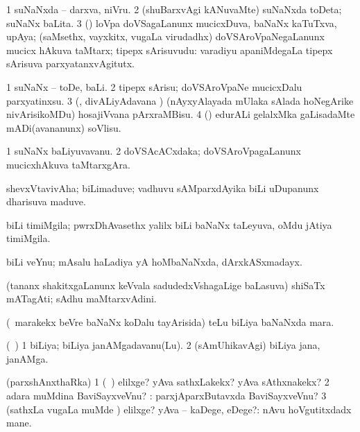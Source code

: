 \bentry
{} 
\gl{\nA}
\expl{}
\bmng
\bnum
\num{1} suNaNxda -- darxva, niVru. 
\num{2} (shuBarxvAgi kANuvaMte) suNaNxda toDeta; suNaNx baLita. 
\num{3} (\rUpa) loVpa doVSagaLanunx mucicxDuva, baNaNx kaTuTxva, upAya; (saMsethx, vayxkitx, \mo vugaLa virudadhx) doVSAroVpaNegaLanunx mucicx hAkuva taMtarx; tipepx sArisuvudu:  varadiyu apaniMdegaLa tipepx sArisuva parxyatanxvAgitutx. 
\enum
\emng
\eentry

\bentry
{} 
\gl{\sakirx}
\bmng
\bnum
\num{1} suNaNx -- toDe, baLi. 
\num{2} tipepx sArisu; doVSAroVpaNe mucicxDalu parxyatinxsu. 
\num{3} (\kaparx, divALiyAdavana \vi) (nAyxyAlayada mUlaka sAlada hoNegArike nivArisikoMDu) hosajiVvana pArxraMBisu. 
\num{4} (\ame) edurALi gelalxMka gaLisadaMte mADi(avananunx) soVlisu. 
\enum
\emng
\eentry

\bentry
{}
\gl{\nA}
\bmng
\bnum
\num{1} suNaNx baLiyuvavanu. 
\num{2} doVSAcACxdaka; doVSAroVpagaLanunx mucicxhAkuva taMtarxgAra. 
\enum
\emng
\eentry

\bentry
{}
\gl{\nA}
\bmng
shevxVtavivAha; biLimaduve; vadhuvu sAMparxdAyika biLi uDupanunx dharisuva maduve. 
\emng
\eentry

\bentry
{} 
\gl{\nA}
\expl{}
\bmng
biLi timiMgila; pwrxDhAvasethx yalilx biLi baNaNx taLeyuva, oMdu jAtiya timiMgila. 
\emng
\eentry

\bentry
{}
\gl{\nA}
\bmng
biLi veYnu; mAsalu haLadiya yA hoMbaNaNxda, dArxkASxmadayx. 
\emng
\eentry

\bentry
{}
\gl{\nA}
\bmng
(tananx shakitxgaLanunx keVvala sadudedxVshagaLige baLasuva) shiSaTx mATagAti; sAdhu maMtarxvAdini. 
\emng
\eentry

\bentry
{}
\gl{\nA}
\bmng
(\kanmu\ marakekx beVre baNaNx koDalu tayArisida) teLu biLiya baNaNxda mara. 
\emng
\eentry

\bentry
{}
\gl{\nA}
\bmng
 (\sA\ \hiV) 
\bnum
\num{1} biLiya; biLiya janAMgadavanu(Lu). 
\num{2} (sAmUhikavAgi) biLiya jana, janAMga. 
\enum
\emng
\eentry

\bentry
{} 
\gl{\kirxvi}
\bmng
(parxshAnxthaRka) 
\bnum
\num{1} (\pArxparx\ \rUpa) elilxge? yAva sathxLakekx? yAva sAthxnakekx? 
\num{2} adara muMdina BaviSayxveVnu? :  parxjAparxButavxda BaviSayxveVnu? 
\num{3} (sathxLa \mo vugaLa muMde \parx) elilxge? yAva -- kaDege, eDege?:  nAvu hoVgutitxdadx mane. 
\enum
\emng
\eentry

